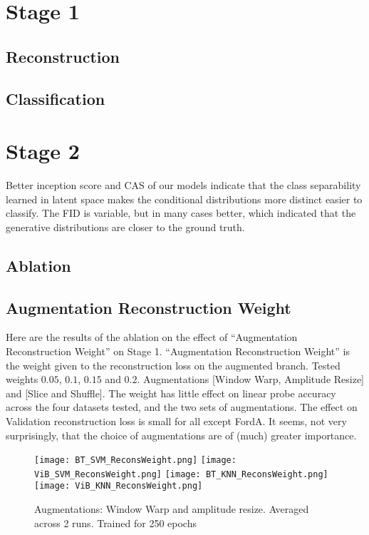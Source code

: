 \documentclass[../../thesis.tex]{subfiles}
\begin{document}
\section{Stage 1}

\subsection{Reconstruction}



\subsection{Classification}
\section{Stage 2}

Better inception score and CAS of our models indicate that the class separability learned in latent space makes the conditional distributions more distinct easier to classify. The FID is variable, but in many cases better, which indicated that the generative distributions are closer to the ground truth.

\subsection{Ablation}

\subsection{Augmentation Reconstruction Weight}
Here are the results of the ablation on the effect of “Augmentation Reconstruction Weight” on Stage 1.
“Augmentation Reconstruction Weight” is the weight given to the reconstruction loss on the augmented branch.
Tested weights $0.05$, $0.1$, $0.15$ and $0.2$.
Augmentations [Window Warp, Amplitude Resize] and [Slice and Shuffle].
The weight has little effect on linear probe accuracy across the four datasets tested, and the two sets of augmentations.
The effect on Validation reconstruction loss is small for all except FordA.
It seems, not very surprisingly, that the choice of augmentations are of (much) greater importance.
\begin{figure}[h]
    \texttt{[image: BT\_SVM\_ReconsWeight.png]}
    \texttt{[image: ViB\_SVM\_ReconsWeight.png]}
    \texttt{[image: BT\_KNN\_ReconsWeight.png]}
    \texttt{[image: ViB\_KNN\_ReconsWeight.png]}
    \centering  
    \caption{Augmentations: Window Warp and amplitude resize. Averaged across 2 runs. Trained for 250 epochs}  
\end{figure}
\end{document}
